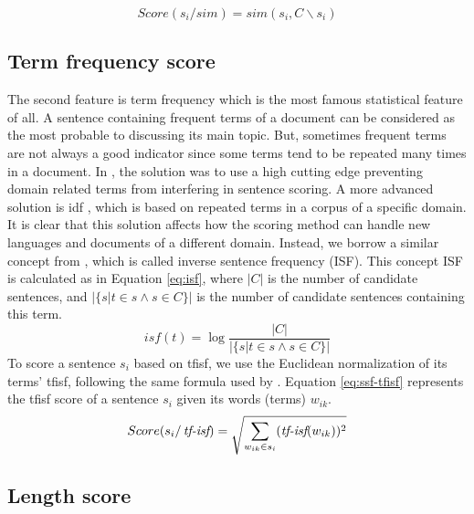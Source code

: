 \begin{equation}
	Score(s_i/ sim) = sim(s_i, C\backslash s_i)
	\label{eq:ssf-sim}
\end{equation}

\subsection{Term frequency score}

The second feature is term frequency which is the most famous statistical feature of all. 
A sentence containing frequent terms of a document can be considered as the most probable to discussing its main topic. 
But, sometimes frequent terms are not always a good indicator since some terms tend to be repeated many times in a document. 
In \citep{58-luhn}, the solution was to use a high cutting edge preventing domain related terms from interfering in sentence scoring.
A more advanced solution is \acf{idf} \citep{73-salton-yang}, which is based on repeated terms in a corpus of a specific domain. 
It is clear that this solution affects how the scoring method can handle new languages and documents of a different domain.
Instead, we borrow a similar concept from \citet{03-allan-al}, which is called inverse sentence frequency (ISF). 
This concept ISF is calculated as in Equation \ref{eq:isf}, where $ |C| $ is the number of candidate sentences, and $ |\{s | t \in s \wedge s \in C \}| $ is the number of candidate sentences containing this term.
\begin{equation}
	isf(t) = \log \frac{|C|}{|\{s | t \in s \wedge s \in C \}|}
	\label{eq:isf}
\end{equation}
%
To score a sentence $ s_i $ based on \ac{tfisf}, we use the Euclidean normalization of its terms' \ac{tfisf}, following the same formula used by \citet{04-nobata-sekine}. 
Equation \ref{eq:ssf-tfisf} represents the \ac{tfisf} score of a sentence $ s_i $ given its words (terms) $ w_{ik} $.
\begin{equation}
	Score(s_i/ \operatorname{\textit{tf-isf}}) = \sqrt{\sum\limits_{w_{ik} \in s_i} (\operatorname{\textit{tf-isf}}(w_{ik}))^2}
	\label{eq:ssf-tfisf}
\end{equation}

\subsection{Length score}

